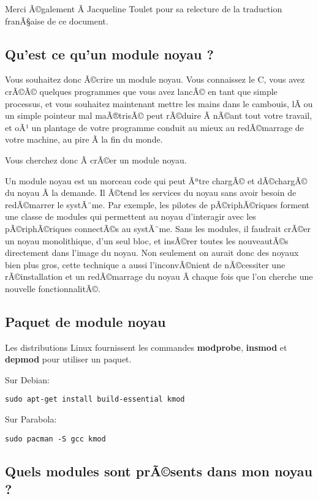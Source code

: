 \documentclass[11pt]{article}
\begin{document}
Merci Ã©galement Ã  Jacqueline Toulet pour sa relecture de la traduction franÃ§aise de ce document.

\subsection*{Qu'est ce qu'un module noyau ?}
\label{sec-1-4}

Vous souhaitez donc Ã©crire un module noyau. Vous connaissez le C, vous avez crÃ©Ã© quelques programmes que vous avez lancÃ© en tant que simple processus, et vous souhaitez maintenant mettre les mains dans le cambouis, lÃ  ou un simple pointeur mal maÃ®trisÃ© peut rÃ©duire Ã  nÃ©ant tout votre travail, et oÃ¹ un plantage de votre programme conduit au mieux au redÃ©marrage de votre machine, au pire Ã  la fin du monde.

Vous cherchez donc Ã  crÃ©er un module noyau.

Un module noyau est un morceau code qui peut Ãªtre chargÃ© et dÃ©chargÃ© du noyau Ã  la demande. Il Ã©tend les services du noyau sans avoir besoin de redÃ©marrer le systÃ¨me. Par exemple, les pilotes de pÃ©riphÃ©riques forment une classe de modules qui permettent au noyau d'interagir avec les pÃ©riphÃ©riques connectÃ©s au systÃ¨me. Sans les modules, il faudrait crÃ©er un noyau monolithique, d'un seul bloc, et insÃ©rer toutes les nouveautÃ©s directement dans l'image du noyau. Non seulement on aurait donc des noyaux bien plus gros, cette technique a aussi l'inconvÃ©nient de nÃ©cessiter une rÃ©installation et un redÃ©marrage du noyau Ã  chaque fois que l'on cherche une nouvelle fonctionnalitÃ©.

\subsection*{Paquet de module noyau}
\label{sec-1-5}

Les distributions Linux fournissent les commandes \textbf{modprobe}, \textbf{insmod} et \textbf{depmod} pour utiliser un paquet.

Sur Debian:

\begin{verbatim}
sudo apt-get install build-essential kmod
\end{verbatim}

Sur Parabola:

\begin{verbatim}
sudo pacman -S gcc kmod
\end{verbatim}

\subsection*{Quels modules sont prÃ©sents dans mon noyau ?}
\label{sec-1-6}
\end{document}
